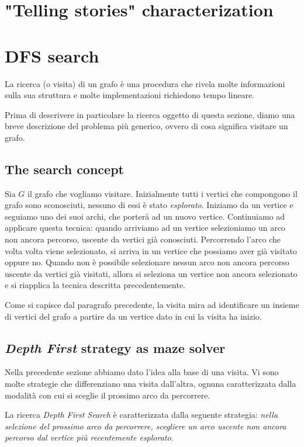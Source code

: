 \section{"Telling stories" characterization}


\section{DFS search}

La ricerca (o visita) di un grafo \`e una procedura che rivela molte
informazioni sulla sua struttura e molte implementazioni richiedono
tempo lineare.

Prima di descrivere in particolare la ricerca oggetto di questa
sezione, diamo una breve descrizione del problema pi\`u generico,
ovvero di cosa significa visitare un grafo. 

\subsection{The search concept}

Sia $G$ il grafo che vogliamo visitare. Inizialmente tutti i vertici
che compongono il grafo sono sconosciuti, nessuno di essi \`e stato
\emph{esplorato}. Iniziamo da un vertice e seguiamo uno dei suoi
archi, che porter\`a ad un nuovo vertice. Continuiamo ad applicare
questa tecnica: quando arriviamo ad un vertice selezioniamo un arco
non ancora percorso, uscente da vertici gi\`a conosciuti. Percorrendo
l'arco che volta volta viene selezionato, si arriva in un vertice che
possiamo aver gi\`a visitato oppure no. Quando non \`e possibile
selezionare nessun arco non ancora percorso uscente da vertici gi\`a
visitati, allora si seleziona un vertice non ancora selezionato e si
riapplica la tecnica descritta precedentemente.

Come si capisce dal paragrafo precedente, la visita mira ad
identificare un insieme di vertici del grafo a partire da un vertice
dato in cui la visita ha inizio.

\subsection{\emph{Depth First} strategy as maze solver}
Nella precedente sezione abbiamo dato l'idea alla base di una
visita. Vi sono molte strategie che differenziano una visita
dall'altra, ognuna caratterizzata dalla modalit\`a con cui si sceglie
il prossimo arco da percorrere.

La ricerca \emph{Depth First Search} \`e caratterizzata dalla seguente
strategia: \emph{nella selezione del prossimo arco da percorrere,
  scegliere un arco uscente non ancora percorso dal vertice pi\`u
  recentemente esplorato}.

